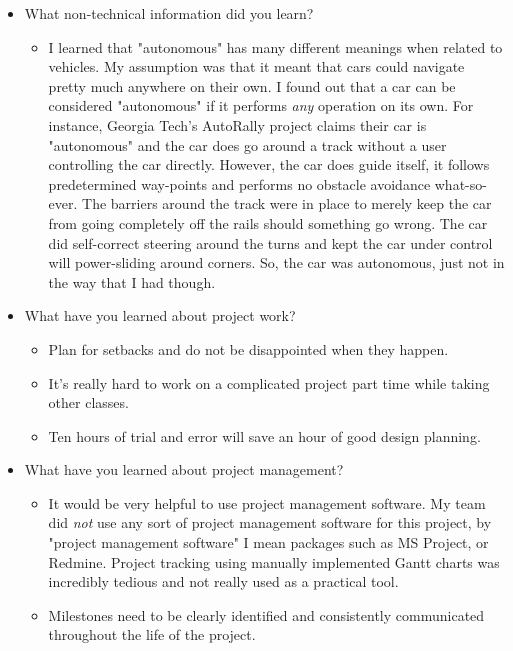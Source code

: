 \documentclass[compsoc,draftclsnofoot,onecolumn,10pt]{IEEEtran}
\begin{document}
\begin{itemize}
    \item What non-technical information did you learn?
    \begin{itemize}
        \item I learned that "autonomous" has many different meanings when related to vehicles. My assumption was that it meant that cars could navigate pretty much anywhere on their own. I found out that a car can be considered "autonomous" if it performs \textit{any} operation on its own. For instance, Georgia Tech's AutoRally project claims their car is "autonomous" and the car does go around a track without a user controlling the car directly. However, the car does guide itself, it follows predetermined way-points and performs no obstacle avoidance what-so-ever. The barriers around the track were in place to merely keep the car from going completely off the rails should something go wrong. The car did self-correct steering around the turns and kept the car under control will power-sliding around corners. So, the car was autonomous, just not in the way that I had though.
    \end{itemize}

    \item What have you learned about project work?
    \begin{itemize}
        \item Plan for setbacks and do not be disappointed when they happen.
        \item It's really hard to work on a complicated project part time while taking other classes.
        \item Ten hours of trial and error will save an hour of good design planning.
        \end{itemize}

    \item What have you learned about project management?
        \begin{itemize}
        \item It would be very helpful to use project management software.
        \subitem My team did \textit{not} use any sort of project management software for this project, by "project management software" I mean packages such as MS Project, or Redmine. Project tracking using manually implemented Gantt charts was incredibly tedious and not really used as a practical tool.
        \item Milestones need to be clearly identified and consistently communicated throughout the life of the project.
    \end{itemize}


\end{itemize}
\end{document}
